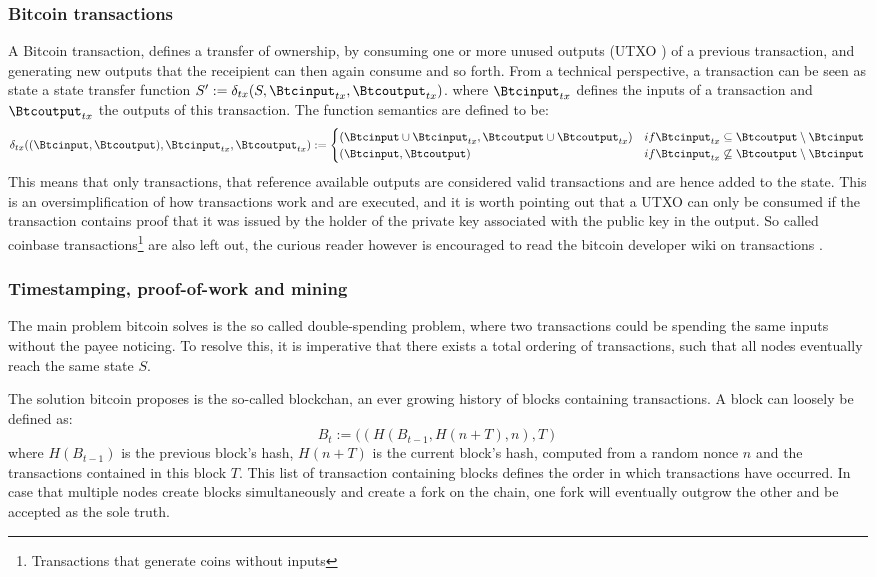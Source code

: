 \documentclass[12pt,msc,a4paper,oneside]{ucl_thesis}
\begin{document}
\subsubsection{Bitcoin transactions}
A Bitcoin transaction, defines a transfer of ownership, by consuming one or more unused outputs (UTXO \cite{bitcoin_wiki:utxo}) of a previous transaction, and generating new outputs that the receipient can then again consume and so forth. From a technical perspective, a transaction can be seen as state a state transfer function $S' := \delta_{tx}(S, \Btcinput_{tx}, \Btcoutput_{tx})$. where $\Btcinput_{tx}$ defines the inputs of a transaction and $\Btcoutput_{tx}$ the outputs of this transaction. The function semantics are defined to be:
\begin{equation}
    \delta_{tx}((\Btcinput, \Btcoutput), \Btcinput_{tx}, \Btcoutput_{tx}) := \begin{cases} 
        (\Btcinput \cup \Btcinput_{tx}, \Btcoutput \cup \Btcoutput_{tx}) & if \Btcinput_{tx} \subseteq \Btcoutput \setminus \Btcinput \\
        (\Btcinput, \Btcoutput) & if \Btcinput_{tx} \not\subseteq \Btcoutput \setminus \Btcinput
    \end{cases}
\end{equation}
This means that only transactions, that reference available outputs are considered valid transactions and are hence added to the state. This is an oversimplification of how transactions work and are executed, and it is worth pointing out that a UTXO can only be consumed if the transaction contains proof that it was issued by the holder of the private key associated with the public key in the output. So called coinbase transactions\footnote{Transactions that generate coins without inputs} are also left out, the curious reader however is encouraged to read the bitcoin developer wiki on transactions \cite{bitcoin_wiki:transactions}.

\subsubsection{Timestamping, proof-of-work and mining}
The main problem bitcoin solves is the so called double-spending problem, where two transactions could be spending the same inputs without the payee noticing. To resolve this, it is imperative that there exists a total ordering of transactions, such that all nodes eventually reach the same state $S$.

The solution bitcoin proposes is the so-called blockchan, an ever growing history of blocks containing transactions. A block can loosely be defined as:
\begin{equation}
    B_t := ((H(B_{t-1}, H(n + T), n), T)
\end{equation}
where $H(B_{t-1})$ is the previous block's hash, $H(n + T)$ is the current block's hash, computed from a random nonce $n$ and the transactions contained in this block $T$. This list of transaction containing blocks defines the order in which transactions have occurred. In case that multiple nodes create blocks simultaneously and create a fork on the chain, one fork will eventually outgrow the other and be accepted as the sole truth.
\end{document}
